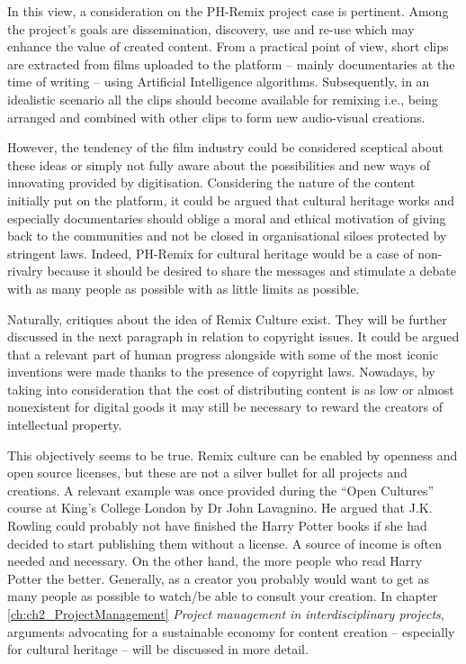 In this view, a consideration on the PH-Remix project case is pertinent. Among the project’s goals are dissemination, discovery, use and re-use which may enhance the value of created content. From a practical point of view, short clips are extracted from films uploaded to the platform – mainly documentaries at the time of writing – using Artificial Intelligence algorithms. Subsequently, in an idealistic scenario all the clips should become available for remixing i.e., being arranged and combined with other clips to form new audio-visual creations.

However, the tendency of the film industry could be considered sceptical about these ideas or simply not fully aware about the possibilities and new ways of innovating provided by digitisation. Considering the nature of the content initially put on the platform, it could be argued that cultural heritage works and especially documentaries should oblige a moral and ethical motivation of giving back to the communities and not be closed in organisational siloes protected by stringent laws. Indeed, PH-Remix for cultural heritage would be a case of non-rivalry because it should be desired to share the messages and stimulate a debate with as many people as possible with as little limits as possible.

Naturally, critiques about the idea of Remix Culture exist. They will be further discussed in the next paragraph in relation to copyright issues. It could be argued that a relevant part of human progress alongside with some of the most iconic inventions were made thanks to the presence of copyright laws. Nowadays, by taking into consideration that the cost of distributing content is as low or almost nonexistent for digital goods it may still be necessary to reward the creators of intellectual property.

This objectively seems to be true. Remix culture can be enabled by openness and open source licenses, but these are not a silver bullet for all projects and creations. A relevant example was once provided during the “Open Cultures” course at King’s College London by Dr John Lavagnino. He argued that J.K. Rowling could probably not have finished the Harry Potter books if she had decided to start publishing them without a license. A source of income is often needed and necessary. On the other hand, the more people who read Harry Potter the better. Generally, as a creator you probably would want to get as many people as possible to watch/be able to consult your creation. In chapter \ref{ch:ch2_ProjectManagement} \emph{Project management in interdisciplinary projects}, arguments advocating for a sustainable economy for content creation – especially for cultural heritage – will be discussed in more detail. 

